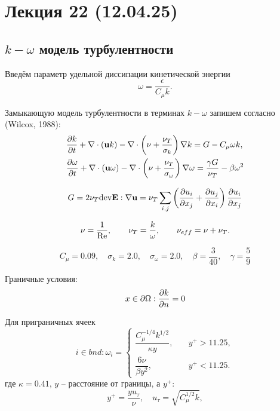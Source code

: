 \section{Лекция 22 (12.04.25)}

\subsection{$k-\omega$ модель турбулентности}

Введём параметр удельной диссипации кинетической энергии
\begin{equation}
\label{eq:turb_omega}
\omega = \frac{\epsilon}{C_\mu k}.
\end{equation}

Замыкающую модель турбулентности в терминах $k-\omega$ запишем согласно (Wilcox, 1988):
\begin{align}
\label{eq:komega}
&\frac{\partial k}{\partial t} + \nabla\cdot(\boldsymbol{\rm u} k) - \nabla \cdot \left(\nu + \frac{\nu_T}{\sigma_k}\right)\nabla k = G - C_\mu \omega k, \\
&\frac{\partial \omega}{\partial t} + \nabla\cdot(\boldsymbol{\rm u} \omega) - \nabla \cdot \left(\nu + \frac{\nu_T}{\sigma_\omega}\right)\nabla \omega = 
	\frac{\gamma G}{\nu_T} - \beta \omega^2
\end{align}

\begin{equation}
G = 2 \nu_T {\rm dev} \boldsymbol{\rm E} : \nabla\boldsymbol{\rm u} = \nu_T \sum_{i,j}\left(\frac{\partial u_i}{\partial x_j} + \frac{\partial u_j}{\partial x_i}\right)\frac{\partial u_i}{\partial x_j}
\end{equation}

\begin{equation}
\nu = \frac{1}{\mathrm{Re}}, \qquad \nu_T = \frac{k}{\omega}, \qquad \nu_{eff} = \nu + \nu_T.
\end{equation}

\begin{equation*}
C_\mu = 0.09, \quad \sigma_k = 2.0, \quad \sigma_\omega = 2.0, \quad \beta = \frac{3}{40}, \quad  \gamma = \frac59
\end{equation*}

Граничные условия:
\begin{equation}
x\in\partial\Omega: \frac{\partial k}{\partial n} = 0
\end{equation}

Для приграничных ячеек
\begin{equation}
i \in bnd: \omega_i = \begin{cases}
\dfrac{C_\mu^{-1/4} k^{1/2}}{\kappa y}, &\quad y^+ > 11.25, \\[10pt]
\dfrac{6 \nu}{\beta y^2},               &\quad y^+ < 11.25.
\end{cases}
\end{equation}
где $\kappa=0.41$, $y$ -- расстояние от границы, а $y^+$:
\begin{equation*}
y^+ = \frac{y u_\tau}{\nu}, \quad u_\tau = \sqrt{C_\mu^{1/2}k},
\end{equation*}

